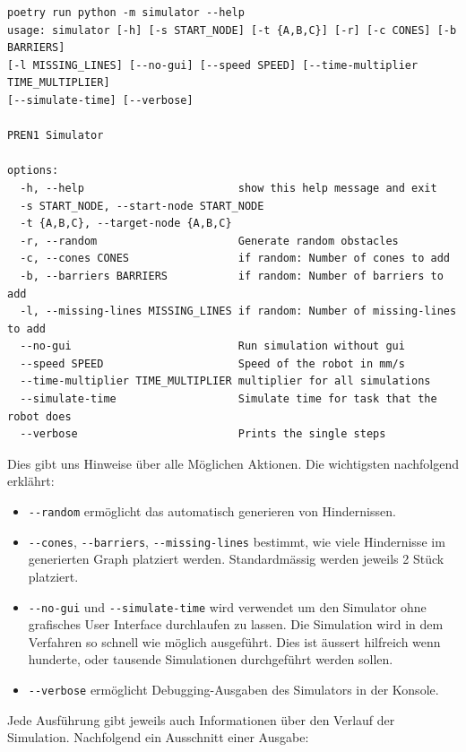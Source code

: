 \begin{footnotesize}
\begin{verbatim}
poetry run python -m simulator --help
usage: simulator [-h] [-s START_NODE] [-t {A,B,C}] [-r] [-c CONES] [-b BARRIERS] 
[-l MISSING_LINES] [--no-gui] [--speed SPEED] [--time-multiplier TIME_MULTIPLIER] 
[--simulate-time] [--verbose]

PREN1 Simulator

options:
  -h, --help                        show this help message and exit
  -s START_NODE, --start-node START_NODE
  -t {A,B,C}, --target-node {A,B,C}
  -r, --random                      Generate random obstacles
  -c, --cones CONES                 if random: Number of cones to add
  -b, --barriers BARRIERS           if random: Number of barriers to add
  -l, --missing-lines MISSING_LINES if random: Number of missing-lines to add
  --no-gui                          Run simulation without gui
  --speed SPEED                     Speed of the robot in mm/s
  --time-multiplier TIME_MULTIPLIER multiplier for all simulations
  --simulate-time                   Simulate time for task that the robot does
  --verbose                         Prints the single steps
\end{verbatim}
\end{footnotesize}

Dies gibt uns Hinweise über alle Möglichen Aktionen. Die wichtigsten nachfolgend erklährt:

\begin{itemize}
    \item \verb|--random| ermöglicht das automatisch generieren von Hindernissen.
    \item \verb|--cones|, \verb|--barriers|, \verb|--missing-lines| bestimmt, wie viele Hindernisse im generierten Graph platziert werden. Standardmässig werden jeweils 2 Stück platziert.
    \item \verb|--no-gui| und \verb|--simulate-time| wird verwendet um den Simulator ohne grafisches User Interface durchlaufen zu lassen. Die Simulation wird in dem Verfahren so schnell wie möglich ausgeführt. Dies ist äussert hilfreich wenn hunderte, oder tausende Simulationen durchgeführt werden sollen.
    \item \verb|--verbose| ermöglicht Debugging-Ausgaben des Simulators in der Konsole.
\end{itemize}

Jede Ausführung gibt jeweils auch Informationen über den Verlauf der Simulation. Nachfolgend ein Ausschnitt einer Ausgabe:


